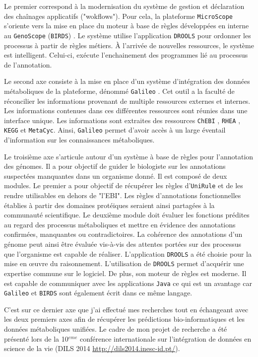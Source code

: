 \begin{refsegment}
Le premier correspond à la modernisation du système de gestion et déclaration des chaînages applicatifs ("wokflows"). Pour cela, la plateforme \texttt{MicroScope} s'oriente vers la mise en place du moteur à base de règles développées en interne au \texttt{GenoScope} (\texttt{\gls{BIRDS}}) . Le système utilise l'application \texttt{DROOLS}\cite{mcwhirter2001drools,browne2009jboss} pour ordonner les processus à partir de règles métiers. À l'arrivée de nouvelles ressources, le système est intelligent. Celui-ci, exécute l’enchainement des programmes lié au processus de l'annotation.

Le second axe consiste à la mise en place d'un système d'intégration des données métaboliques de la plateforme, dénommé \texttt{Galileo} \cite{galileo2014}. Cet outil a la faculté de réconcilier les informations provenant de multiple ressources externes et internes. Les informations contenues dans ces différentes ressources sont réunies dans une interface unique. Les informations sont extraites des ressources \texttt{ChEBI} \cite{hastings2013chebi}, \texttt{RHEA} \cite{alcantara2012rhea}, \texttt{KEGG} et \texttt{MetaCyc}. Ainsi, \texttt{Galileo} permet d'avoir accès à un large éventail d'information sur les connaissances métaboliques. 

Le troisième axe s'articule autour d'un système à base de règles pour l'annotation des génomes. Il a pour objectif de guider le biologiste sur les annotations suspectées manquantes dans un organisme donné. Il est composé de deux modules. Le premier a pour objectif de récupérer les règles d'\texttt{UniRule} et de les rendre utilisables en dehors de "l'\gls{EBI}". Les règles d'annotations fonctionnelles établies à partir des domaines protéiques seraient ainsi partagées à la communauté scientifique. Le deuxième module doit évaluer les fonctions prédites au regard des processus métaboliques et mettre en évidence des annotations confirmées, manquantes ou contradictoires. La cohérence des annotations d'un génome peut ainsi être évaluée vis-à-vis des attentes portées sur des processus que l'organisme est capable de réaliser. L'application \texttt{DROOLS} a été choisie pour la mise en œuvre du raisonnement. L'utilisation de  \texttt{DROOLS} permet d'acquérir une expertise commune sur le logiciel. De plus, son moteur de règles est moderne. Il est capable de communiquer avec les applications \texttt{Java} ce  qui est un avantage car \texttt{Galileo} et \texttt{BIRDS} sont également écrit dans ce même langage.

C'est sur ce dernier axe que j'ai effectué mes recherches tout en échangeant avec les deux premiers axes afin de récupérer les prédictions bio-informatiques et les données métaboliques unifiées. Le cadre de mon projet de recherche a été présenté lors de la 10$^{eme}$ conférence internationale sur l'intégration de données en science de la vie (DILS 2014 \url{http://dils2014.inesc-id.pt/}).


\end{refsegment}
